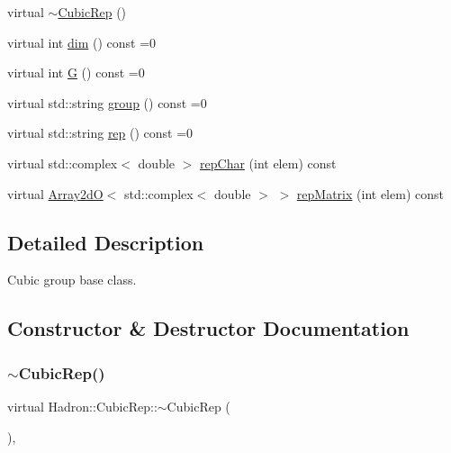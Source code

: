 \begin{DoxyCompactItemize}
\item 
virtual \mbox{\hyperlink{structHadron_1_1CubicRep_a8daf9ed601e434933082fd1cc4fec396}{$\sim$\+Cubic\+Rep}} ()
\item 
virtual int \mbox{\hyperlink{structHadron_1_1CubicRep_ac178d14064f037a66af4b9fb4b312d51}{dim}} () const =0
\item 
virtual int \mbox{\hyperlink{structHadron_1_1CubicRep_a52104e43266d1614c00bbd1c3b395458}{G}} () const =0
\item 
virtual std\+::string \mbox{\hyperlink{structHadron_1_1CubicRep_a0748f11ec87f387062c8e8981339a29c}{group}} () const =0
\item 
virtual std\+::string \mbox{\hyperlink{structHadron_1_1CubicRep_ac3eb63608803d44c68681f158e14eb1b}{rep}} () const =0
\item 
virtual std\+::complex$<$ double $>$ \mbox{\hyperlink{structHadron_1_1CubicRep_af45227106e8e715e84b0af69cd3b36f8}{rep\+Char}} (int elem) const
\item 
virtual \mbox{\hyperlink{classADAT_1_1Array2dO}{Array2dO}}$<$ std\+::complex$<$ double $>$ $>$ \mbox{\hyperlink{structHadron_1_1CubicRep_ac5d7e9e6f4ab1158b5fce3e4ad9e8005}{rep\+Matrix}} (int elem) const
\end{DoxyCompactItemize}


\subsection{Detailed Description}
Cubic group base class. 

\subsection{Constructor \& Destructor Documentation}
\mbox{\label{structHadron_1_1CubicRep_a8daf9ed601e434933082fd1cc4fec396}} 
\subsubsection{\texorpdfstring{$\sim$CubicRep()}{~CubicRep()}\hspace{0.1cm}{\footnotesize\ttfamily [1/3]}}
{\footnotesize\ttfamily virtual Hadron\+::\+Cubic\+Rep\+::$\sim$\+Cubic\+Rep (\begin{DoxyParamCaption}{ }\end{DoxyParamCaption})\hspace{0.3cm}{\ttfamily [inline]}, {\ttfamily [virtual]}}

